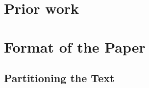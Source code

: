 \documentclass{article}
\begin{document}

\section{Prior work}


\section{Format of the Paper} 
 
\subsection{Partitioning the Text} 
\end{document}
